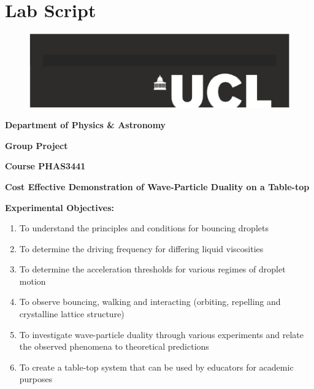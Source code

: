 \section{Lab Script}
\setcounter{equation}{0}
\setcounter{figure}{0}

\begin{figure}[h]
    \centering
    \includegraphics[width=\textwidth]{prototype/UCLlogo.png}
\end{figure}
\bigskip

\begin{center}
\textbf{{\Large Department of Physics \& Astronomy}}

\textbf{{\Large Group Project}}

\textbf{{\Large Course PHAS3441}}

\end{center}
\bigskip

\begin{center}
\noindent\textbf{{\LARGE Cost Effective Demonstration of Wave-Particle Duality on a Table-top}}
\end{center}
\bigskip

\noindent \textbf{Experimental Objectives:}

\begin{enumerate}
\item To understand the principles and conditions for bouncing droplets

\item To determine the driving frequency for differing liquid viscosities

\item To determine the acceleration thresholds for various regimes of droplet motion

\item To observe bouncing, walking and interacting (orbiting, repelling and crystalline lattice structure)

\item To investigate wave-particle duality through various experiments and relate the observed phenomena to theoretical predictions

\item To create a table-top system that can be used by educators for academic purposes
\end{enumerate}
\clearpage
